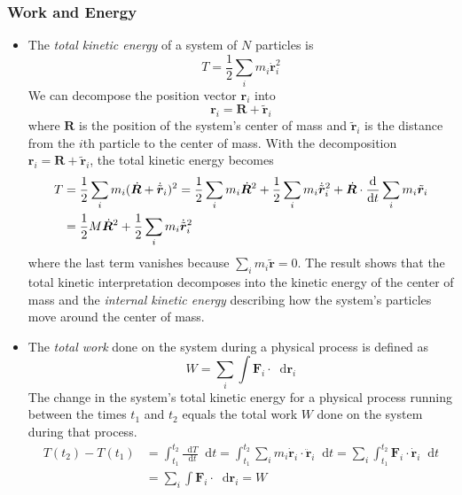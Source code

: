 \documentclass[11pt, a4paper]{article}
\newcommand{\diff}{\mathop{}\!\mathrm{d}} %
\newcommand{\bdot}[1]{\dot{\bm{#1}}}
\newcommand{\bddot}[1]{\ddot{\bm{#1}}}
\begin{document}
\subsubsection{Work and Energy}
\begin{itemize}
	\item The \textit{total kinetic energy} of a system of $ N $ particles is 
	\begin{equation*}
		T = \frac{1}{2}\sum_{i}m_{i}\bdot{r}_{i}^{2}
	\end{equation*}
 	We can decompose the position vector $ \bm{r}_{i} $ into
	\begin{equation*}
		\bm{r}_{i} = \bm{R} + \tilde{\bm{r}}_{i}
	\end{equation*}
	where $ \bm{R} $ is the position of the system's center of mass and $ \tilde{\bm{r}}_{i} $ is the distance from the $ i $th particle to the center of mass. With the decomposition $ \bm{r}_{i} = \bm{R} + \tilde{\bm{r}}_{i} $, the total kinetic energy becomes
	\begin{align*}
		T &= \frac{1}{2} \sum_{i}m_{i}(\bdot{R} + \dot{\tilde{\bm{r}}}_{i})^{2}  = \frac{1}{2}\sum_{i}m_{i} \bdot{R}^{2} + \frac{1}{2}\sum_{i}m_{i}\dot{\tilde{\bm{r}}}_{i}^{2} + \bdot{R} \cdot \dv{}{t}\sum_{i} m_{i} \tilde{\bm{r}}_{i}\\
		&= \frac{1}{2} M\bdot{R}^{2} + \frac{1}{2}\sum_{i}m_{i}\dot{\tilde{\bm{r}}}_{i}^{2}
	\end{align*}
	where the last term vanishes because $ \sum_{i} m_{i}\tilde{\bm{r}} = 0$.
	The result shows that the total kinetic interpretation decomposes into the kinetic energy of the center of mass and the \textit{internal kinetic energy} describing how the system's particles move around the center of mass.
	
	\item The \textit{total work} done on the system during a physical process is defined as
	\begin{equation*}
		W = \sum_{i}\int \bm{F}_{i} \cdot \diff \bm{r}_{i}
	\end{equation*}	
	The change in the system's total kinetic energy for a physical process running between the times $ t_{1} $ and $ t_{2} $ equals the total work $ W $ done on the system during that process.
	\begin{align*}
		T(t_{2}) - T(t_{1}) &= \int_{t_{1}}^{t_{2}} \frac{\diff T}{\diff t}\diff t = \int_{t_{1}}^{t_{2}} \sum_{i}m_{i}\bdot{r}_{i}\cdot \bddot{r}_{i} \diff t= \sum_{i} \int_{t_{1}}^{t_{2}} \bm{F}_{i}\cdot \bdot{r}_{i} \diff t\\
		&=\sum_{i} \int \bm{F}_{i} \cdot \diff \bm{r}_{i} =	W
	\end{align*}
	

\end{itemize}
\end{document}
